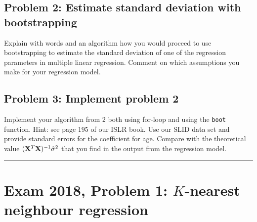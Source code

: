 \documentclass[]{article}
\newenvironment{Shaded}{\begin{snugshade}}{\end{snugshade}}
\newcommand{\KeywordTok}[1]{\textcolor[rgb]{0.13,0.29,0.53}{\textbf{#1}}}
\newcommand{\DataTypeTok}[1]{\textcolor[rgb]{0.13,0.29,0.53}{#1}}
\newcommand{\DecValTok}[1]{\textcolor[rgb]{0.00,0.00,0.81}{#1}}
\newcommand{\StringTok}[1]{\textcolor[rgb]{0.31,0.60,0.02}{#1}}
\newcommand{\OperatorTok}[1]{\textcolor[rgb]{0.81,0.36,0.00}{\textbf{#1}}}
\newcommand{\NormalTok}[1]{#1}
\begin{document}
\subsection{Problem 2: Estimate standard deviation with
bootstrapping}\label{problem-2-estimate-standard-deviation-with-bootstrapping}

Explain with words and an algorithm how you would proceed to use
bootstrapping to estimate the standard deviation of one of the
regression parameters in multiple linear regression. Comment on which
assumptions you make for your regression model.

\subsection{Problem 3: Implement problem
2}\label{problem-3-implement-problem-2}

Implement your algorithm from 2 both using for-loop and using the
\texttt{boot} function. Hint: see page 195 of our ISLR book. Use our
SLID data set and provide standard errors for the coefficient for age.
Compare with the theoretical value
\(({\bf X}^T{\bf X})^{-1}\hat{\sigma}^2\) that you find in the output
from the regression model.

\begin{Shaded}
\end{Shaded}

\begin{center}\rule{0.5\linewidth}{\linethickness}\end{center}

\section{\texorpdfstring{Exam 2018, Problem 1: \(K\)-nearest neighbour
regression}{Exam 2018, Problem 1: K-nearest neighbour regression}}\label{exam-2018-problem-1-k-nearest-neighbour-regression}
\end{document}
